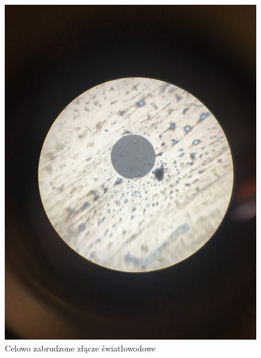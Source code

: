 \documentclass[12pt, a4paper, oneside]{article}
\begin{document}
\begin{figure}[t]
\centering
\caption{Celowo zabrudzone złącze światłowodowe}
\includegraphics[scale=0.1]{m1.jpg}
\end{figure}
\end{document}
